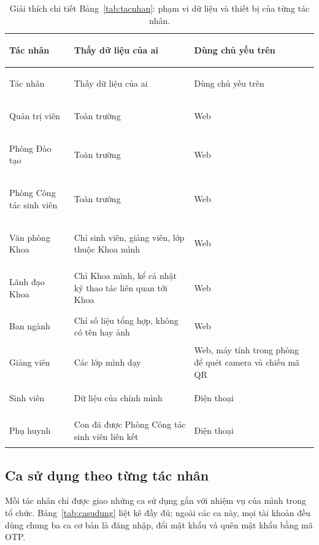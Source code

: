 {\small
\begin{xltabular}{\textwidth}{@{}>{\bfseries\raggedright\arraybackslash\leavevmode}p{3.6cm} >{\raggedright\arraybackslash\leavevmode}X >{\raggedright\arraybackslash\leavevmode}p{4.4cm}@{}}
\caption{Giải thích chi tiết Bảng~\ref{tab:tacnhan}: phạm vi dữ liệu và thiết bị của từng tác nhân.}
\label{tab:tacnhan-gt}\\
\toprule
Tác nhân & Thấy dữ liệu của ai & Dùng chủ yếu trên \\
\midrule
\endfirsthead
\toprule
Tác nhân & Thấy dữ liệu của ai & Dùng chủ yếu trên \\
\midrule
\endhead
\bottomrule
\endfoot
Quản trị viên & Toàn trường & Web \\
Phòng Đào tạo & Toàn trường & Web \\
Phòng Công tác sinh viên & Toàn trường & Web \\
Văn phòng Khoa & Chỉ sinh viên, giảng viên, lớp thuộc Khoa mình & Web \\
Lãnh đạo Khoa & Chỉ Khoa mình, kể cả nhật ký thao tác liên quan tới Khoa & Web \\
Ban ngành & Chỉ số liệu tổng hợp, không có tên hay ảnh & Web \\
Giảng viên & Các lớp mình dạy & Web, máy tính trong phòng để quét camera và chiếu mã QR \\
Sinh viên & Dữ liệu của chính mình & Điện thoại \\
Phụ huynh & Con đã được Phòng Công tác sinh viên liên kết & Điện thoại \\
\end{xltabular}}

\subsection{Ca sử dụng theo từng tác nhân}
\label{sec:casudung}

Mỗi tác nhân chỉ được giao những ca sử dụng \cite{OMG2017UML} gắn với nhiệm vụ của mình trong
tổ chức. Bảng~\ref{tab:casudung} liệt kê đầy đủ; ngoài các ca này, mọi tài
khoản đều dùng chung ba ca cơ bản là đăng nhập, đổi mật khẩu và quên mật khẩu
bằng mã OTP.

